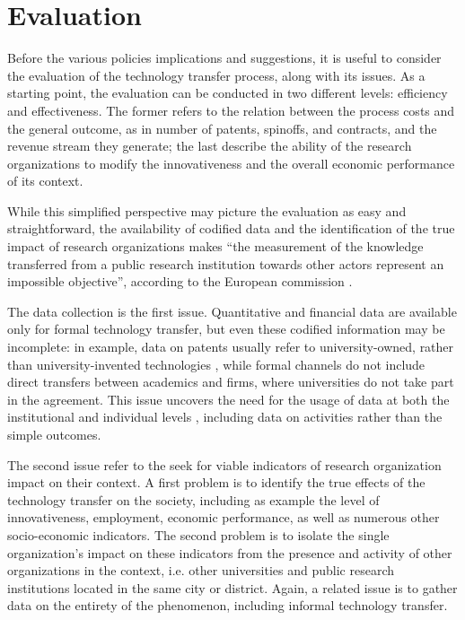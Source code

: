 

\label{Chapter5} %

\section{Evaluation}

Before the various policies implications and suggestions, it is useful to consider the evaluation of the technology transfer process, along with its issues. As a starting point, the evaluation can be conducted in two different levels: efficiency and effectiveness. The former refers to the relation between the process costs and the general outcome, as in number of patents, spinoffs, and contracts, and the revenue stream they generate; the last describe the ability of the research organizations to modify the innovativeness and the overall economic performance of its context. 

While this simplified perspective may picture the evaluation as easy and straightforward, the availability of codified data and the identification of the true impact of research organizations makes \enquote{the measurement of the knowledge transferred from a public research institution towards other actors represent an impossible objective}, according to the European commission \citep{Balderi2010}. 

The data collection is the first issue. Quantitative and financial data are available only for formal technology transfer, but even these codified information may be incomplete: in example, data on patents usually refer to university-owned, rather than university-invented technologies \citep{Geuna2009}, while formal channels do not include direct transfers between academics and firms, where universities do not take part in the agreement. This issue uncovers the need for the usage of data at both the institutional and individual levels \citep{Wong2010}, including data on activities rather than the simple outcomes. 

The second issue refer to the seek for viable indicators of research organization impact on their context. A first problem is to identify the true effects of the technology transfer on the society, including as example the level of innovativeness, employment, economic performance, as well as numerous other socio-economic indicators. The second problem is to isolate the single organization's impact on these indicators from the presence and activity of other organizations in the context, i.e. other universities and public research institutions located in the same city or district. Again, a related issue is to gather data on the entirety of the phenomenon, including informal technology transfer. 

